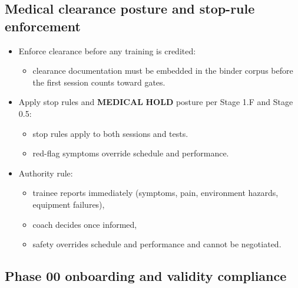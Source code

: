 \documentclass[10pt]{article}
\begin{document}
\subsection*{Medical clearance posture and stop-rule enforcement}
{}

\begin{itemize}
\item Enforce clearance before any training is credited:
  \begin{itemize}
  \item clearance documentation must be embedded in the binder corpus before the first session counts toward gates.
  \end{itemize}
\item Apply stop rules and \textbf{MEDICAL} \textbf{HOLD} posture per Stage 1.F and Stage 0.5:
  \begin{itemize}
  \item stop rules apply to both sessions and tests.
  \item red-flag symptoms override schedule and performance.
  \end{itemize}
\item Authority rule:
  \begin{itemize}
  \item trainee reports immediately (symptoms, pain, environment hazards, equipment failures),
  \item coach decides once informed,
  \item safety overrides schedule and performance and cannot be negotiated.
  \end{itemize}
\end{itemize}

\subsection*{Phase 00 onboarding and validity compliance}
{}
\end{document}
